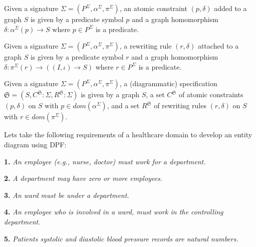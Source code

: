 \documentclass{eceasst}
\begin{document}
\begin{definition}
 Given a signature $\Sigma = (P^\Sigma, \alpha^\Sigma, \pi^\Sigma)$, an atomic constraint $(p, \delta)$ added to a graph $S$ is given by a predicate symbol $p$ and a graph 
 homomorphism $\delta : \alpha^{\Sigma}(p) \rightarrow S$ where $p \in P^\Sigma$ is a predicate. 
\end{definition}



\begin{definition}
 Given a signature $\Sigma = (P^\Sigma, \alpha^\Sigma, \pi^\Sigma)$, a rewriting rule $(r, \delta)$ attached to a graph $S$ is given by a predicate symbol $r$ and a graph 
 homomorphism $\delta : \pi^{\Sigma}(r) \rightarrow ((I, \iota) \rightarrow S)$ where $r \in P^\Sigma$ is a predicate. 
\end{definition}


\begin{definition}[Specification]
 Given a signature $\Sigma = (P^\Sigma, \alpha^\Sigma, \pi^\Sigma)$, a (diagrammatic) specification $\mathfrak{S} = (S, C^{\mathfrak{S}}:\Sigma, R^{\mathfrak{S}}:\Sigma )$ 
 is given by 
 a graph $S$, 
 a set $C^\mathfrak{S}$ of atomic constraints $(p, \delta)$ on $S$ with $p \in dom(\alpha^\Sigma)$, and
 a set $R^\mathfrak{S}$ of rewriting rules $(r, \delta)$ on $S$ with $r \in dom(\pi^\Sigma)$. 

\end{definition}



Lets take the following requirements of a healthcare domain to develop an entity diagram using DPF:


\textbf{1.} \textit{An employee (e.g., nurse, doctor) must work for a department. }

\textbf{2.} \textit{A department may have zero or more employees. }

\textbf{3.} \textit{An ward must be under a department. }

\textbf{4.} \textit{An employee who is involved in a ward, must work in the controlling department. }



\textbf{5.} \textit{Patients systolic and diastolic blood pressure records are natural numbers. }
\end{document}
